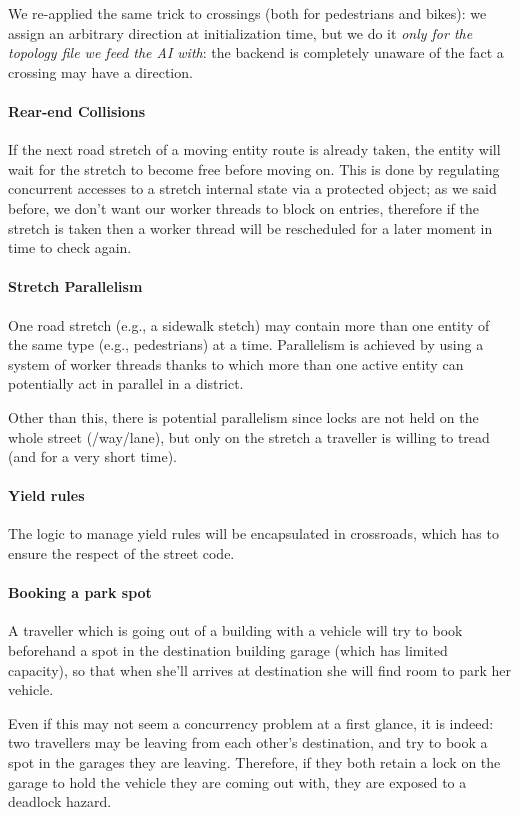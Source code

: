 We re-applied the same trick to crossings (both for pedestrians and bikes): we
assign an arbitrary direction at initialization time, but we do it
\textit{only for the topology file we feed the AI with}: the backend is
completely unaware of the fact a crossing may have a direction.

\paragraph{Rear-end Collisions}
If the next road stretch of a moving entity route is already taken, the entity
will wait for the stretch to become free before moving on.
This is done by regulating concurrent accesses to a stretch internal state via
a protected object; as we said before, we don't want our worker threads to
block on entries, therefore if the stretch is taken then a worker thread will
be rescheduled for a later moment in time to check again.

\paragraph{Stretch Parallelism}
One road stretch (e.g., a sidewalk stetch) may contain more than one entity of
the same type (e.g., pedestrians) at a time.
Parallelism is achieved by using a system of worker threads thanks to which
more than one active entity can potentially act in parallel in a district.

Other than this, there is potential parallelism since locks are not held on the
whole street (/way/lane), but only on the stretch a traveller is willing to
tread (and for a very short time).

\paragraph{Yield rules}
The logic to manage yield rules will be encapsulated in crossroads, which has
to ensure the respect of the street code.

\paragraph{Booking a park spot}
A traveller which is going out of a building with a vehicle will try to book
beforehand a spot in the destination building garage (which has limited
capacity), so that when she'll arrives at destination she will find room to
park her vehicle.

Even if this may not seem a concurrency problem at a first glance, it is
indeed: two travellers may be leaving from each other's destination, and try
to book a spot in the garages they are leaving.
Therefore, if they both retain a lock on the garage to hold the vehicle they
are coming out with, they are exposed to a deadlock hazard.

